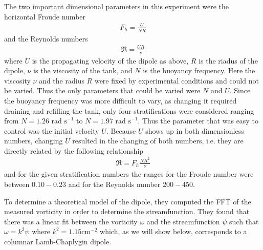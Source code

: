 The two important dimensional parameters in this experiment were the horizontal Froude number 
\begin{align}
F_{h} = \frac{U}{NR}
\end{align}
and the Reynolds numbers
\begin{align}
\Re= \frac{UR}{\nu}
\end{align}
where $U$ is the propagating velocity of the dipole as above, $R$ is the riadus of the dipole, $\nu$ is the viscosity of the tank, and $N$ is the buoyancy frequency. Here the viscosity $\nu$ and the radius $R$ were fixed by experimental conditions and could not be varied. Thus the only parameters that could be varied were $N$ and $U$. Since the buoyancy frequency was more difficult to vary, as changing it required draining and refilling the tank, only four stratifications were considered ranging from $N=1.26 \text{ rad s}^{-1}$ to $N=1.97 \text { rad s}^{-1}$. Thus the parameter that was easy to control was the initial velocity $U$. Because $U$ shows up in both dimensionless numbers, changing $U$ resulted in the changing of both numbers, i.e. they are directly related by the following relationship 
\begin{align}
\Re = F_{h}\frac{NR^{2}}{\nu}
\end{align} 
and for the given stratification numbers the ranges for the Froude number were between $0.10 - 0.23$ and for the Reynolds number $200-450$.

To determine a theoretical model of the dipole, they computed the FFT of the measured vorticity in order to determine the streamfunction. They found that there was a linear fit between the vorticity $\omega$ and the streamfunction $\psi$ such that $\omega = k^{2}\psi$ where $k^{2}=1.15 \text{cm}^{-2}$  which, as we will show below, corresponds to a columnar Lamb-Chaplygin dipole.

